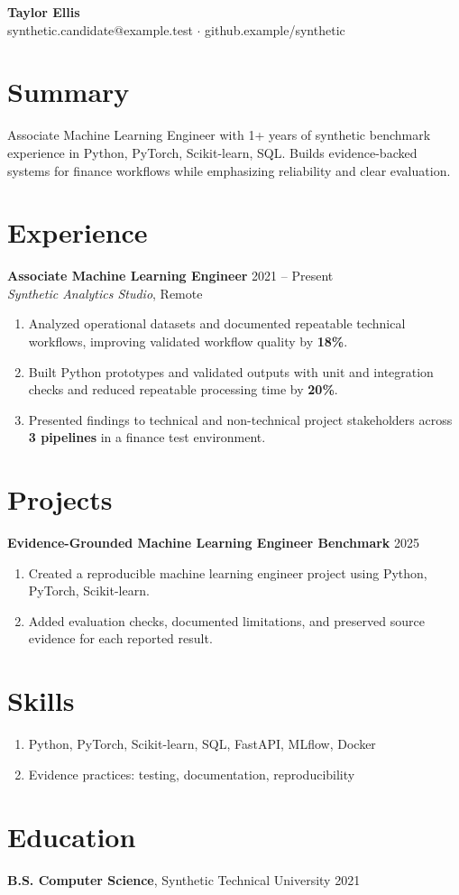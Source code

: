 \documentclass[10pt,letterpaper]{article}
\begin{document}
\begin{center}
{\Large \textbf{Taylor Ellis}}\\
synthetic.candidate@example.test $\cdot$ github.example/synthetic
\end{center}

\section*{Summary}
Associate Machine Learning Engineer with 1+ years of synthetic benchmark experience in Python, PyTorch, Scikit-learn, SQL. Builds evidence-backed systems for finance workflows while emphasizing reliability and clear evaluation.

\section*{Experience}
\textbf{Associate Machine Learning Engineer} \hfill 2021 -- Present\\
\textit{Synthetic Analytics Studio}, Remote
\begin{enumerate}
  \item Analyzed operational datasets and documented repeatable technical workflows, improving validated workflow quality by \textbf{18\%}.
  \item Built Python prototypes and validated outputs with unit and integration checks and reduced repeatable processing time by \textbf{20\%}.
  \item Presented findings to technical and non-technical project stakeholders across \textbf{3 pipelines} in a finance test environment.
\end{enumerate}

\section*{Projects}
\textbf{Evidence-Grounded Machine Learning Engineer Benchmark} \hfill 2025
\begin{enumerate}
  \item Created a reproducible machine learning engineer project using Python, PyTorch, Scikit-learn.
  \item Added evaluation checks, documented limitations, and preserved source evidence for each reported result.
\end{enumerate}

\section*{Skills}
\begin{enumerate}
  \item Python, PyTorch, Scikit-learn, SQL, FastAPI, MLflow, Docker
  \item Evidence practices: testing, documentation, reproducibility
\end{enumerate}

\section*{Education}
\textbf{B.S. Computer Science}, Synthetic Technical University \hfill 2021
\end{document}

